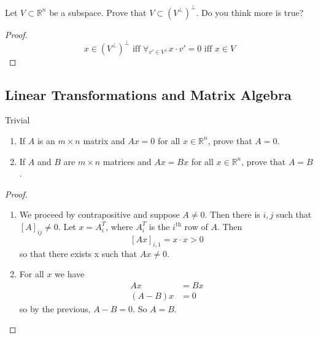 \begin{exercise} \label{e1.3.10}
    Let \(V \subset \mathbb{R}^n\) be a subspace. Prove that \(V \subset \left(V^{\perp}\right)^{\perp}\). Do you think more is true?
    
    \begin{proof}
        \[x \in \left(V^{\perp}\right)^{\perp} \text{ iff } \forall_{v' \in V^{\perp}} x \cdot v' = 0 \text{ iff } x \in V\]
    \end{proof}
\end{exercise} %

\subsection{Linear Transformations and Matrix Algebra}

\begin{exercise} \label{e1.4.1}
    Trivial
\end{exercise} %

\begin{exercise} \label{e1.4.2}
    \begin{enumerate}
        \item If \(A\) is an \(m \times n\) matrix and \(Ax=0\) for all \(x \in \mathbb{R}^n\), prove that \(A=0\). 
        
        \item If \(A\) and \(B\) are \(m \times n\) matrices and \(Ax=Bx\) for all \(x \in \mathbb{R}^n\), prove that \(A=B\).
    \end{enumerate}
    
    \begin{proof}
        \begin{enumerate}
            \item We proceed by contrapositive and suppose \(A\neq 0\). Then there is \(i,j\) such that \([A]_{ij}\neq 0\). Let \(x=A_{i}^{T}\), where \( A_{i}^{T}\) is the \(i^{\text{th}}\) row of \(A\). Then
            \[[Ax]_{i,1}=x \cdot x>0\]
            so that there exists x such that \(Ax \neq 0 \).
            \item For all \( x \) we have
            \begin{align*}
                Ax &= Bx \\
                (A-B)x &= 0
            \end{align*}
            so by the previous, \(A-B=0\). So \(A=B\).
        \end{enumerate}
    \end{proof}
\end{exercise} %

